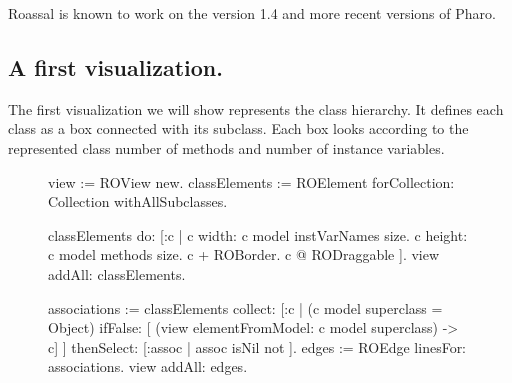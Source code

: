 \documentclass[a4paper,10pt,twoside]{book}
\begin{document}
Roassal is known to work on the version 1.4 and more recent versions of Pharo.

\subsection{A first visualization.}

The first visualization we will show represents the  class hierarchy. It defines each class as a box connected with its subclass. Each box looks according to the represented class number of methods and number of instance variables.

\begin{figure}[H]
      \begin{minipage}[t]{0.5\textwidth}
      \vspace{0pt}
\begin{code}{}
view := ROView new.
classElements := ROElement forCollection: Collection withAllSubclasses.

classElements 
	do: [:c | 
		c width: c model instVarNames size.
		c height: c model methods size.
		c + ROBorder. 
		c @ RODraggable ].
view addAll: classElements.

associations := classElements collect: [:c | 
	(c model superclass = Object)
		ifFalse: [ (view elementFromModel: c model superclass) -> c]
	 ] thenSelect: [:assoc | assoc isNil not ].
edges := ROEdge linesFor: associations.
view addAll: edges.


\end{code}
\end{minipage}
\end{figure}
\end{document}
